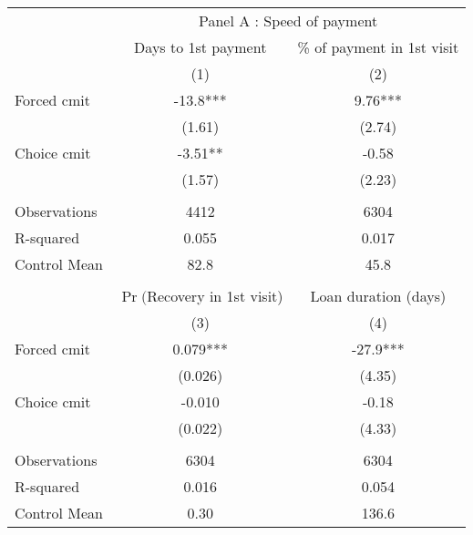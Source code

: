 \begin{tabular}{lcc}
\toprule
      & \multicolumn{2}{c}{Panel A  : Speed of payment} \\
\cmidrule{2-3}      & Days to 1st payment & \% of payment in 1st visit \\
\midrule
\midrule
      & (1)   & (2) \\
\midrule
\midrule
Forced cmit & -13.8*** & 9.76*** \\
      & (1.61) & (2.74) \\
Choice cmit & -3.51** & -0.58 \\
      & (1.57) & (2.23) \\
      &       &  \\
\midrule
Observations & 4412  & 6304 \\
R-squared & 0.055 & 0.017 \\
Control Mean & 82.8  & 45.8 \\
\midrule
\midrule
      &       &  \\
\midrule
      & $\Pr($Recovery in 1st visit) & Loan duration (days) \\
\midrule
\midrule
      & (3)   & (4) \\
\midrule
\midrule
Forced cmit & 0.079*** & -27.9*** \\
      & (0.026) & (4.35) \\
Choice cmit & -0.010 & -0.18 \\
      & (0.022) & (4.33) \\
      &       &  \\
\midrule
Observations & 6304  & 6304 \\
R-squared & 0.016 & 0.054 \\
Control Mean & 0.30  & 136.6 \\
\bottomrule
\bottomrule
\end{tabular}%
